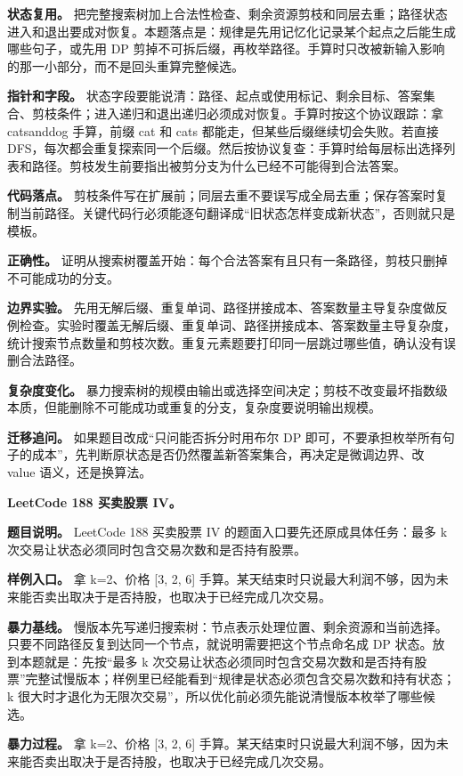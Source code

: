 \textbf{状态复用。} 把完整搜索树加上合法性检查、剩余资源剪枝和同层去重；路径状态进入和退出要成对恢复。本题落点是：规律是先用记忆化记录某个起点之后能生成哪些句子，或先用 DP 剪掉不可拆后缀，再枚举路径。手算时只改被新输入影响的那一小部分，而不是回头重算完整候选。

\textbf{指针和字段。} 状态字段要能说清：路径、起点或使用标记、剩余目标、答案集合、剪枝条件；进入递归和退出递归必须成对恢复。手算时按这个协议跟踪：拿 catsanddog 手算，前缀 cat 和 cats 都能走，但某些后缀继续切会失败。若直接 DFS，每次都会重复探索同一个后缀。然后按协议复查：手算时给每层标出选择列表和路径。剪枝发生前要指出被剪分支为什么已经不可能得到合法答案。

\textbf{代码落点。} 剪枝条件写在扩展前；同层去重不要误写成全局去重；保存答案时复制当前路径。关键代码行必须能逐句翻译成“旧状态怎样变成新状态”，否则就只是模板。

\textbf{正确性。} 证明从搜索树覆盖开始：每个合法答案有且只有一条路径，剪枝只删掉不可能成功的分支。

\textbf{边界实验。} 先用无解后缀、重复单词、路径拼接成本、答案数量主导复杂度做反例检查。实验时覆盖无解后缀、重复单词、路径拼接成本、答案数量主导复杂度，统计搜索节点数量和剪枝次数。重复元素题要打印同一层跳过哪些值，确认没有误删合法路径。

\textbf{复杂度变化。} 暴力搜索树的规模由输出或选择空间决定；剪枝不改变最坏指数级本质，但能删除不可能成功或重复的分支，复杂度要说明输出规模。

\textbf{迁移追问。} 如果题目改成“只问能否拆分时用布尔 DP 即可，不要承担枚举所有句子的成本”，先判断原状态是否仍然覆盖新答案集合，再决定是微调边界、改 value 语义，还是换算法。

\noindent\textbf{LeetCode 188 买卖股票 IV。}

\textbf{题目说明。} LeetCode 188 买卖股票 IV 的题面入口要先还原成具体任务：最多 k 次交易让状态必须同时包含交易次数和是否持有股票。

\textbf{样例入口。} 拿 k=2、价格 [3, 2, 6] 手算。某天结束时只说最大利润不够，因为未来能否卖出取决于是否持股，也取决于已经完成几次交易。

\textbf{暴力基线。} 慢版本先写递归搜索树：节点表示处理位置、剩余资源和当前选择。只要不同路径反复到达同一个节点，就说明需要把这个节点命名成 DP 状态。放到本题就是：先按“最多 k 次交易让状态必须同时包含交易次数和是否持有股票”完整试慢版本；样例里已经能看到“规律是状态必须包含交易次数和持有状态；k 很大时才退化为无限次交易”，所以优化前必须先能说清慢版本枚举了哪些候选。

\textbf{暴力过程。} 拿 k=2、价格 [3, 2, 6] 手算。某天结束时只说最大利润不够，因为未来能否卖出取决于是否持股，也取决于已经完成几次交易。

